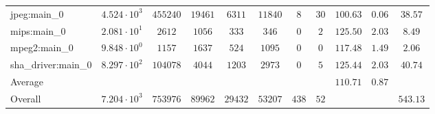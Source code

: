 \begin{tabular}{|l|c|c|c|c|c|c|c|c|c|c|}
jpeg:main\_0            & $ 4.524 \cdot 10^{3}  $ & $ 455240 $ & $ 19461 $ & $ 6311  $ & $ 11840 $ & $ 8   $ & $ 30 $ & $ 100.63      $ & $ 0.06    $ & $ 38.57   $ \\
mips:main\_0            & $ 2.081 \cdot 10^{1}  $ & $ 2612   $ & $ 1056  $ & $ 333   $ & $ 346   $ & $ 0   $ & $ 2  $ & $ 125.50      $ & $ 2.03    $ & $ 8.49    $ \\
mpeg2:main\_0           & $ 9.848 \cdot 10^{0}  $ & $ 1157   $ & $ 1637  $ & $ 524   $ & $ 1095  $ & $ 0   $ & $ 0  $ & $ 117.48      $ & $ 1.49    $ & $ 2.06    $ \\
sha\_driver:main\_0     & $ 8.297 \cdot 10^{2}  $ & $ 104078 $ & $ 4044  $ & $ 1203  $ & $ 2973  $ & $ 0   $ & $ 5  $ & $ 125.44      $ & $ 2.03    $ & $ 40.74   $ \\
\hline
Average                 & $                     $ & $        $ & $       $ & $       $ & $       $ & $     $ & $    $ & $ 110.71      $ & $ 0.87    $ & $         $ \\
\hline
Overall                 & $ 7.204 \cdot 10^{3}  $ & $ 753976 $ & $ 89962 $ & $ 29432 $ & $ 53207 $ & $ 438 $ & $ 52 $ & $             $ & $         $ & $ 543.13  $ \\
\hline
\end{tabular}
